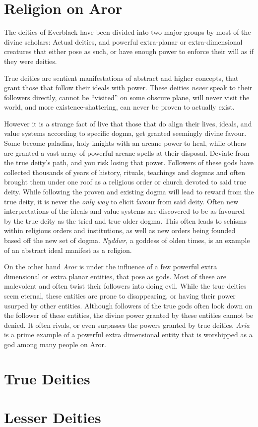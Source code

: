 \section*{Religion on Aror}

The deities of Everblack have been divided into two major groups by most of
the divine scholars: Actual deities, and powerful extra-planar or
extra-dimensional creatures that either pose as such, or have enough power to
enforce their will as if they were deities.

True deities are sentient manifestations of abstract and higher concepts, that
grant those that follow their ideals with power. These deities \emph{never}
speak to their followers directly, cannot be ``visited'' on some obscure plane,
will never visit the world, and more existence-shattering, can never be proven
to actually exist.

However it is a strange fact of live that those that do align their lives,
ideals, and value systems according to specific dogma, get granted seemingly
divine favour. Some become paladins, holy knights with an arcane power to
heal, while others are granted a vast array of powerful arcane spells at their
disposal. Deviate from the true deity's path, and you risk losing that
power. Followers of these gods have collected thousands of years of history,
rituals, teachings and dogmas and often brought them under one roof as a
religious order or church devoted to said true deity. While following the
proven and existing dogma will lead to reward from the true deity, it is never
the \emph{only way} to elicit favour from said deity. Often new
interpretations of the ideals and value systems are discovered to be as
favoured by the true deity as the tried and true older dogma. This often leads
to schisms within religious orders and institutions, as well as new orders
being founded based off the new set of dogma. \emph{Nyddwr}, a goddess of
olden times, is an example of an abstract ideal manifest as a religion.

On the other hand \emph{Aror} is under the influence of a few powerful extra
dimensional or extra planar entities, that pose as gods. Most of these are
malevolent and often twist their followers into doing evil. While the true
deities seem eternal, these entities are prone to disappearing, or having
their power usurped by other entities. Although followers of the true gods
often look down on the follower of these entities, the divine power granted
by these entities cannot be denied. It often rivals, or even surpasses the
powers granted by true deities. \emph{Aria} is a prime example of a powerful
extra dimensional entity that is worshipped as a god among many people on
Aror.


\section*{True Deities}





\section*{Lesser Deities}

